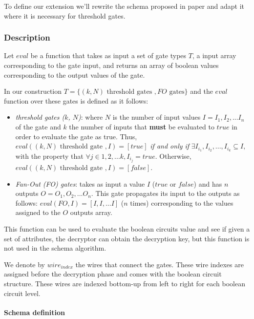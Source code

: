 \documentclass[12pt]{article}
\begin{document}
To define our extension we'll rewrite the schema proposed in \cite{fltccd} paper and adapt it where it is necessary for threshold gates.

\subsubsection{Description}

Let $eval$ be a function that takes as input a set of gate types $T$, a input array corresponding to the gate input, and returns an array of boolean values corresponding to the output values of the gate.

In our construction $T = \{(k, N) \textrm{ threshold gates }, FO \textrm{ gates}\}$ and the $eval$ function over these gates is defined as it follows:

\begin{itemize}
 	\item \textit{threshold gates ($k$, $N$)}: where $N$ is the number of input values $I = I_1, I_2, ...I_n$ of the gate and $k$ the number of inputs that \textbf{must} be evaluated to $true$ in order to evaluate the gate as true. Thus, $eval((k, N) \textrm{ threshold gate }, I) = [true]$ \textit{if and only if} $\exists I_{i_1}, I_{i_2}, ..., I_{i_k} \subseteq I, $ with the property that $\forall j \in {1, 2, ...k}, I_{i_j} = true$. Otherwise, $eval((k, N) \textrm{ threshold gate }, I) = [false]$.

 	\item \textit{Fan-Out (FO) gates}: takes as input a value $I$ ($true$ or $false$) and has $n$ outputs $O = O_1, O_2, ... O_n$. This gate propagates its input to the outputs as follows: $eval(FO, I) = [I, I, ...I]$ ($n$ times) corresponding to the values assigned to the $O$ outputs array.
\end{itemize}

This function can be used to evaluate the boolean circuits value and see if given a set of attributes, the decryptor can obtain the decryption key, but this function is not used in the schema algorithm.

We denote by $wire_{index}$ the wires that connect the gates. These wire indexes are assigned before the decryption phase and comes with the boolean circuit structure. These wires are indexed bottom-up from left to right for each boolean circuit level.

\paragraph{Schema definition}
\end{document}
